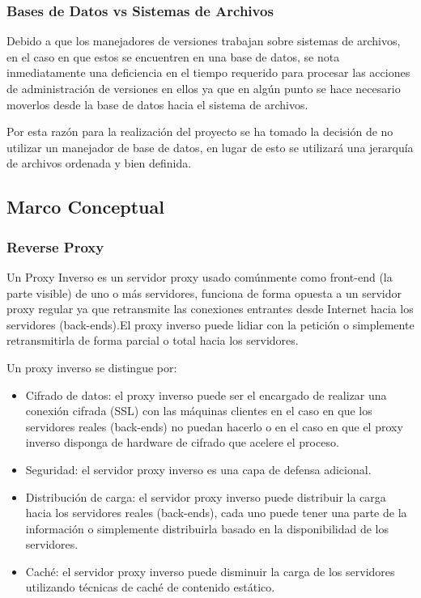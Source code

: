 \subsubsection{Bases de Datos vs Sistemas de Archivos}

Debido a que los manejadores de versiones trabajan sobre sistemas de archivos, en el caso en que estos se encuentren en una base de datos, se nota inmediatamente una deficiencia en el tiempo requerido para procesar las acciones de administración de versiones en ellos ya que en algún punto se hace necesario moverlos desde la base de datos hacia el sistema de archivos.

Por esta razón para la realización del proyecto se ha tomado la decisión de no utilizar un manejador de base de datos, en lugar de esto se utilizará una jerarquía de archivos ordenada y bien definida.



\subsection{Marco Conceptual}

\subsubsection*{Reverse Proxy}

Un Proxy Inverso es un servidor proxy usado comúnmente como front-end (la parte visible) de uno o más servidores, funciona de forma opuesta a un servidor proxy regular ya que retransmite las conexiones entrantes desde Internet hacia los servidores (back-ends).\newline El proxy inverso puede lidiar con la petición o simplemente retransmitirla de forma parcial o total hacia los servidores.

Un proxy inverso se distingue por:

\begin{itemize}

	\item Cifrado de datos: el proxy inverso puede ser el encargado de realizar una conexión cifrada (SSL) con las máquinas clientes en el caso en que los servidores reales (back-ends) no puedan hacerlo o en el caso en que el proxy inverso disponga de hardware de cifrado que acelere el proceso.
	
	\item Seguridad: el servidor proxy inverso es una capa de defensa adicional.
	
	\item Distribución de carga: el servidor proxy inverso puede distribuir la carga hacia los servidores reales (back-ends), cada uno puede tener una parte de la información o simplemente distribuirla basado en la disponibilidad de los servidores.
	
	\item Caché: el servidor proxy inverso puede disminuir la carga de los servidores utilizando técnicas de caché de contenido estático.

\end{itemize}



